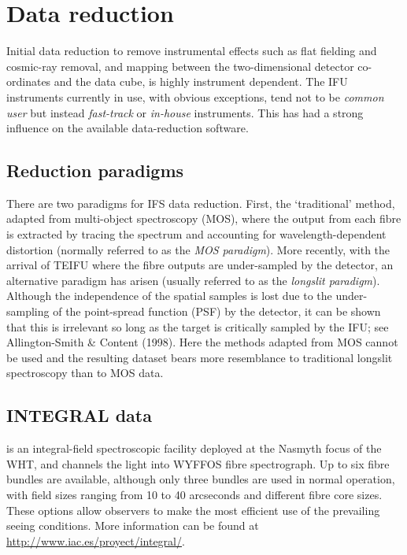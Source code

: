 \documentclass[twoside,11pt]{starlink}
\begin{document}
\section{Data reduction\label{sc16_reduction}}

Initial data reduction to remove instrumental effects such as flat
fielding and cosmic-ray removal, and mapping between the
two-dimensional detector co-ordinates and the data cube, is highly
instrument dependent.  The IFU instruments currently in use, with
obvious exceptions, tend not to be \emph{common user} but instead \emph{fast-track} or \emph{in-house} instruments.  This has had a strong
influence on the available data-reduction software.

\subsection{Reduction paradigms\label{sc16_paradigms}}

There are two paradigms for IFS data reduction.  First, the
`traditional' method, adapted from multi-object spectroscopy (MOS),
where the output from each fibre is extracted by tracing the spectrum
and accounting for wavelength-dependent distortion (normally referred
to as the \emph{MOS paradigm}).  More recently, with the arrival of
TEIFU where the fibre outputs are under-sampled by the detector, an
alternative paradigm has arisen (usually referred to as the \emph{longslit paradigm}).  Although the independence of the spatial samples
is lost due to the under-sampling of the point-spread function (PSF)
by the detector, it can be shown that this is irrelevant so long as
the target is critically sampled by the IFU; see Allington-Smith \&
Content (1998).  Here the methods adapted from MOS cannot be used and
the resulting dataset bears more resemblance to traditional longslit
spectroscopy than to MOS data.

\subsection{INTEGRAL data\label{sc16_integral}}

is an integral-field spectroscopic facility deployed at the Nasmyth
focus of the WHT, and channels the light into WYFFOS fibre
spectrograph.  Up to six fibre bundles are available, although only
three bundles are used in normal operation, with field sizes ranging
from 10 to 40 arcseconds and different fibre core sizes.  These
options allow observers to make the most efficient use of the
prevailing seeing conditions.  More information can be found
at \url{http://www.iac.es/proyect/integral/}.
\end{document}
